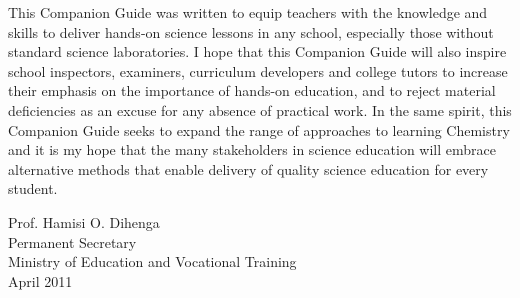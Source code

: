 This Companion Guide was written to equip teachers with the knowledge and skills to deliver hands-on science lessons in any school, especially those without standard science laboratories. I hope that this Companion Guide will also inspire school inspectors, examiners, curriculum developers and college tutors to increase their emphasis on the importance of hands-on education, and to reject material deficiencies as an excuse for any absence of practical work. In the same spirit, this Companion Guide seeks to expand the range of approaches to learning Chemistry and it is my hope that the many stakeholders in science education will embrace alternative methods that enable delivery of quality science education for every student.\\[40pt]
\begin{figure}[h!]
\def\svgwidth{200pt}

\end{figure}
\vspace{-20pt}
\begin{flushleft}
Prof. Hamisi O. Dihenga\\
Permanent Secretary\\
Ministry of Education and Vocational Training\\
April 2011
\end{flushleft}